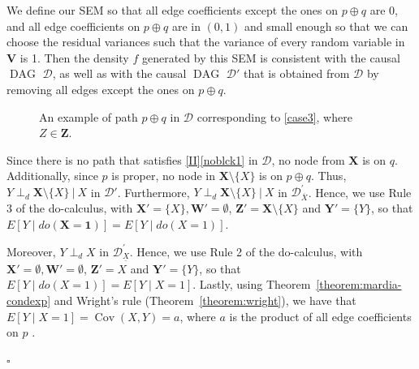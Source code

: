 \documentclass[11pt,a4paper]{article}
\newcommand\given[1][]{\:#1\vert\:}
\newcommand{\dsepp}{\perp_{d}}
\newenvironment{proofof}[1][]{\begin{trivlist}
   \item[\hskip \labelsep {\bfseries Proof of #1.}]}{\hfill{}$\square$\end{trivlist}}
\DeclareMathOperator{\Cov}{Cov}
\DeclareMathOperator{\DAG}{DAG}
\newcommand{\g}[1][G]{\mathcal{#1}}
\begin{document}
\begin{proofof}[Theorem~\ref{theorem:completeness ac}]
\begin{enumerate}[label=(\roman*)]
We define our SEM so that all edge coefficients  except the ones on $p \oplus q$ are $0$, and all edge coefficients  on $p \oplus q$ are in $(0,1)$ and small enough so that we can choose the residual variances such that the variance of every random variable in $\mathbf{V}$ is 1. Then the density $f$ generated by this SEM is consistent with the causal $\DAG$ $\g[D]$, as well as with the causal $\DAG$ $\g[D']$ that is obtained from $\g[D]$ by removing all edges except the ones on $p \oplus q$.
\begin{figure}
\centering
{}
\caption{An example of path $p \oplus q$ in $\g[D]$ corresponding to \ref{case3}, where $Z \in \mathbf{Z}$.}
\label{fig:case3}
\end{figure}

 Since there is no path that satisfies \ref{II}\ref{noblck1} in $\g[D]$, no node from $\mathbf{X}$ is on $q$. Additionally, since $p$ is proper, no node in $\mathbf{X} \setminus \{X\}$ is on $p \oplus q$. Thus, $Y \dsepp \mathbf{X}\setminus \{X\} \given X$ in $\g[D']$. Furthermore, $Y \dsepp \mathbf{X}\setminus \{X\} \given X$ in $\g[D]^{'}_{\overline{X}}$. Hence, we use Rule 3 of the do-calculus, with $\mathbf{X'} = \{X\}, \mathbf{W'} = \emptyset$, $\mathbf{Z'} = \mathbf{X}\setminus \{X\}$ and $ \mathbf{Y'} = \{Y\}$, so that $E[ Y \mid do(\mathbf{X}=\mathbf{1})]= E[ Y \mid do(X=1)]$.

Moreover, $Y \dsepp X $ in $\g[D]^{'}_{\underline{X}}$. Hence, we use Rule 2 of the do-calculus, with $\mathbf{X'} = \emptyset, \mathbf{W'} = \emptyset$, $\mathbf{Z'} = X$ and $ \mathbf{Y'} = \{Y\}$, so that $E[ Y \mid do(X=1)]= E[ Y \mid X=1]$. Lastly, using Theorem~\ref{theorem:mardia-condexp} and Wright's rule (Theorem~\ref{theorem:wright}), we have that $E[ Y \mid X=1] = \Cov(X,Y) = a$, where $a$ is the product of all edge coefficients on $p$ .


\end{enumerate}
\end{proofof}
\end{document}
